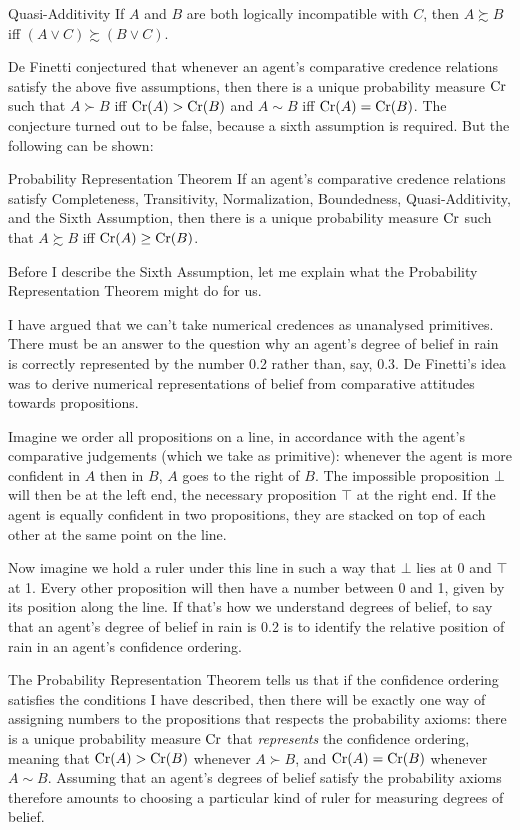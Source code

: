 \begin{genericthm}{Quasi-Additivity}
  If $A$ and $B$ are both logically incompatible with $C$, then $A
  \succsim B$ iff $(A \lor C) \succsim (B \lor C)$.
\end{genericthm}

De Finetti conjectured that whenever an agent's comparative credence
relations satisfy the above five assumptions, then there is a unique
probability measure $\text{Cr}$ such that $A \succ B$ iff $\text{Cr}(A) > \text{Cr}(B)$
and $A \sim B$ iff $\text{Cr}(A) = \text{Cr}(B)$. The conjecture turned out to be
false, because a sixth assumption is required. But the following can
be shown:
%
\begin{genericthm}{Probability Representation Theorem}
  If an agent's comparative credence relations satisfy Completeness,
  Transitivity, Normalization, Boundedness, Quasi-Additivity, and the
  Sixth Assumption, then there is a unique probability measure $\text{Cr}$
  such that $A \succsim B$ iff $\text{Cr}(A) \geq \text{Cr}(B)$.
\end{genericthm}
%
Before I describe the Sixth Assumption, let me explain what the
Probability Representation Theorem might do for us.

I have argued that we can't take numerical credences as unanalysed
primitives. There must be an answer to the question why an agent's
degree of belief in rain is correctly represented by the number 0.2
rather than, say, 0.3. De Finetti's idea was to derive numerical
representations of belief from comparative attitudes towards
propositions.

Imagine we order all propositions on a line, in accordance with the
agent's comparative judgements (which we take as primitive): whenever
the agent is more confident in $A$ then in $B$, $A$ goes to the right
of $B$. The impossible proposition $\bot$ will then be at the left
end, the necessary proposition $\top$ at the right end. If the agent
is equally confident in two propositions, they are stacked on top of
each other at the same point on the line.

Now imagine we hold a ruler under this line in such a way that $\bot$
lies at 0 and $\top$ at 1. Every other proposition will then have a
number between 0 and 1, given by its position along the line. If
that's how we understand degrees of belief, to say that an agent's
degree of belief in rain is 0.2 is to identify the relative position
of rain in an agent's confidence ordering.

The Probability Representation Theorem tells us that if the confidence
ordering satisfies the conditions I have described, then there will be
exactly one way of assigning numbers to the propositions that respects
the probability axioms: there is a unique probability measure $\text{Cr}$
that \emph{represents} the confidence ordering, meaning that
$\text{Cr}(A) > \text{Cr}(B)$ whenever $A \succ B$, and $\text{Cr}(A) = \text{Cr}(B)$ whenever
$A \sim B$. Assuming that an agent's degrees of belief satisfy the
probability axioms therefore amounts to choosing a particular kind of
ruler for measuring degrees of belief.

